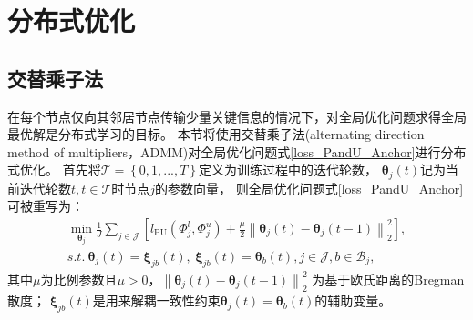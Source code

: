\section{分布式优化}\label{Distributed}
\subsection{交替乘子法}\label{ADMM}
在每个节点仅向其邻居节点传输少量关键信息的情况下，对全局优化问题求得全局最优解是分布式学习的目标。
本节将使用交替乘子法(alternating direction method of multipliers，ADMM)对全局优化问题式\eqref{loss_PandU_Anchor}进行分布式优化。
首先将$\mathcal{T}=\left\{0,1,...,T\right\}$定义为训练过程中的迭代轮数，
$\boldsymbol{\theta}_j\left(t\right)$记为当前迭代轮数$t,t\in\mathcal{T}$时节点$j$的参数向量，
则全局优化问题式\eqref{loss_PandU_Anchor}可被重写为：
\begin{equation}
    \label{global_cost_with_L}
    \begin{split}
        \min_{\boldsymbol{\theta}_j}\frac{1}{J}\sum\limits_{j \in \mathcal{J}}
        \left[l_{\mathrm{PU}}\left(\boldsymbol\varPhi_j^l,\boldsymbol\varPhi_j^u\right) 
        +\frac{\mu}{2}\left\| {\boldsymbol{\theta}_j\left(t\right) - \boldsymbol{\theta}_j\left( {t - 1} \right)} \right\|_2^2 \right],\\
        s.t.~{\boldsymbol{\theta}_j}\left(t\right)={\boldsymbol{\xi}_{jb}}\left(t\right),
        ~{\boldsymbol{\xi}_{jb}}\left(t\right)={\boldsymbol{\theta}_b}\left(t\right),j \in \mathcal{J},b \in \mathcal{B}_j,
    \end{split}
\end{equation}
其中$\mu$为比例参数且$\mu>0$，$\left\|{\boldsymbol{\theta}_j\left(t\right)-\boldsymbol{\theta}_j\left({t-1}\right)}\right\|_2^2$
为基于欧氏距离的Bregman散度；
${\boldsymbol{\xi}_{jb}}\left(t\right)$是用来解耦一致性约束${{\boldsymbol{\theta}_j}\left(t\right)}={\boldsymbol{\theta}_b}\left(t\right)$的辅助变量。


